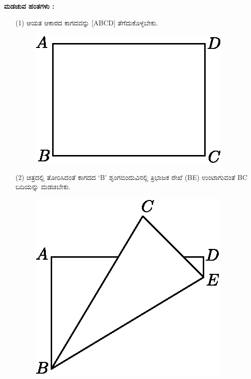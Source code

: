\textbf{ಮಡಚುವ ಹಂತಗಳು :}
\begin{enumerate}
\item[(1)] ಆಯತ ಆಕಾರದ ಕಾಗದವನ್ನು [ABCD] ತೆಗೆದುಕೊಳ್ಳಬೇಕು.
\begin{figure}[H]
\centering
\includegraphics[scale=.98]{src/figure/chap1/fig1-8a.eps}
\end{figure}

\item[(2)] ಚಿತ್ರದಲ್ಲಿ ತೋರಿಸಿದಂತೆ ಕಾಗದದ `B' ಶೃಂಗಬಿಂದುವಿನಲ್ಲಿ ತ್ರಿಭಾಜಕ ರೇಖೆ  (BE) ಉಂಟಾಗುವಂತೆ BC ಬದಿಯನ್ನು ಮಡಚಿಬೇಕು.
\begin{figure}[H]
\centering
\includegraphics[scale=.98]{src/figure/chap1/fig1-8b.eps}
\end{figure}


\end{enumerate}

